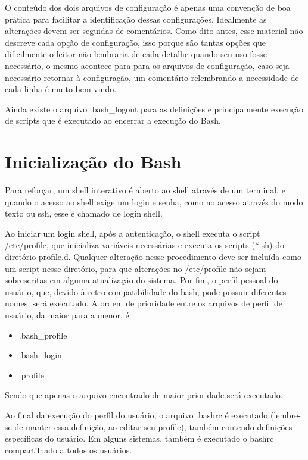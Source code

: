 \documentclass[oneside, 11 pt]{article}
\begin{document}
	O conteúdo dos dois arquivos de configuração é apenas uma convenção de boa prática para facilitar a identificação dessas configurações. Idealmente as alterações devem ser seguidas de comentários. Como dito antes, esse material não descreve cada opção de configuração, isso porque são tantas opções que dificilmente o leitor não lembraria de cada detalhe quando seu uso fosse necessário, o mesmo acontece para para os arquivos de configuração, caso seja necessário retornar à configuração, um comentário relembrando a necessidade de cada linha é muito bem vindo.
	
	Ainda existe o arquivo .bash\_logout para as definições e principalmente execução de scripts que é executado ao encerrar a execução do Bash.

	\section{Inicialização do Bash}
	Para reforçar, um shell interativo é aberto ao shell através de um terminal, e quando o acesso ao shell exige um login e senha, como no acesso através do modo texto ou ssh, esse é chamado de login shell.
	
	Ao iniciar um login shell, após a autenticação, o shell executa o script /etc/profile, que inicializa variáveis necessárias e executa os scripts (*.sh) do diretório profile.d. Qualquer alteração nesse procedimento deve ser incluída como um script nesse diretório, para que alterações no /etc/profile não sejam sobrescritas em alguma atualização do sistema. Por fim, o perfil pessoal do usuário, que, devido à retro-compatibilidade do bash, pode possuir diferentes nomes, será executado. A ordem de prioridade entre os arquivos de perfil de usuário, da maior para a menor, é:
	
	\begin{samepage}
		\begin{itemize}
			\item .bash\_profile
			\item .bash\_login
			\item .profile
		\end{itemize}
	\end{samepage}
	Sendo que apenas o arquivo encontrado de maior prioridade será executado.
	
	Ao final da execução do perfil do usuário, o arquivo .bashrc é executado (lembre-se de manter essa definição, ao editar seu profile), também contendo definições específicas do usuário. Em alguns sistemas, também é executado o bashrc compartilhado a todos os usuários.
	
\end{document}
